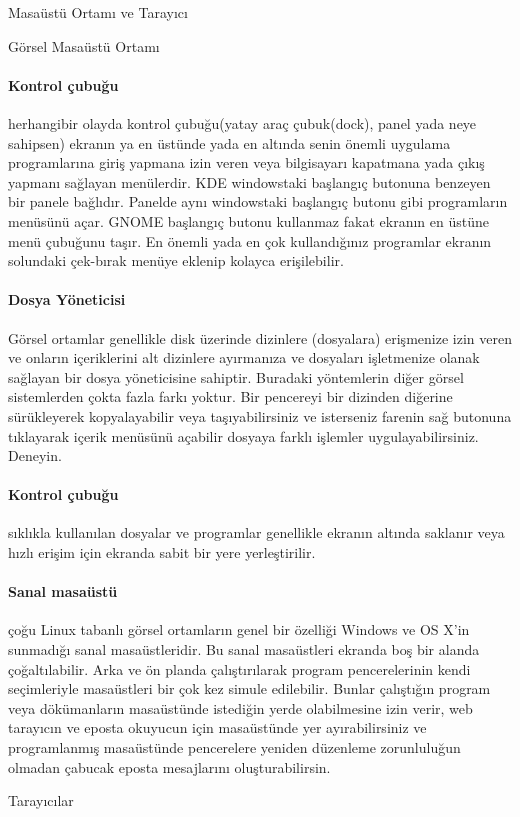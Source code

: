 \documentclass[10pt,a5paper]{book}
\begin{document}
\begin{section}{Masaüstü Ortamı ve Tarayıcı}
\begin{subsection}{Görsel Masaüstü Ortamı}
\paragraph{Kontrol çubuğu}{ herhangibir olayda kontrol çubuğu(yatay araç çubuk(dock), panel yada neye sahipsen) ekranın ya en üstünde yada en altında senin önemli uygulama programlarına giriş yapmana izin veren veya bilgisayarı kapatmana yada çıkış yapmanı sağlayan menülerdir. KDE windowstaki başlangıç butonuna benzeyen bir panele bağlıdır. Panelde aynı windowstaki başlangıç butonu gibi programların menüsünü açar. GNOME başlangıç butonu kullanmaz fakat ekranın en üstüne menü çubuğunu taşır. En önemli yada en çok kullandığınız programlar ekranın solundaki çek-bırak menüye eklenip kolayca erişilebilir.}
\paragraph{Dosya Yöneticisi}{ Görsel ortamlar genellikle disk üzerinde dizinlere (dosyalara) erişmenize izin veren ve onların içeriklerini alt dizinlere ayırmanıza ve dosyaları işletmenize olanak sağlayan bir dosya yöneticisine sahiptir. Buradaki yöntemlerin diğer görsel sistemlerden çokta fazla farkı yoktur. Bir pencereyi bir dizinden diğerine sürükleyerek kopyalayabilir veya taşıyabilirsiniz ve isterseniz farenin sağ butonuna tıklayarak içerik menüsünü açabilir dosyaya farklı işlemler uygulayabilirsiniz. Deneyin.}
\paragraph{Kontrol çubuğu}{ sıklıkla kullanılan dosyalar ve programlar genellikle ekranın altında saklanır veya hızlı erişim için ekranda sabit bir yere yerleştirilir. }
\paragraph{Sanal masaüstü}{ çoğu Linux tabanlı görsel ortamların genel bir özelliği Windows ve OS X’in sunmadığı sanal masaüstleridir. Bu sanal masaüstleri ekranda boş bir alanda çoğaltılabilir. Arka ve ön planda çalıştırılarak program pencerelerinin kendi seçimleriyle masaüstleri bir çok kez simule edilebilir. Bunlar çalıştığın program veya dökümanların masaüstünde istediğin yerde olabilmesine izin verir, web tarayıcın ve eposta okuyucun için masaüstünde yer ayırabilirsiniz ve programlanmış masaüstünde pencerelere yeniden düzenleme zorunluluğun olmadan çabucak eposta mesajlarını  oluşturabilirsin.}
\end{subsection}
\begin{subsection}{Tarayıcılar}


\end{subsection}
\end{section}
\end{document}
